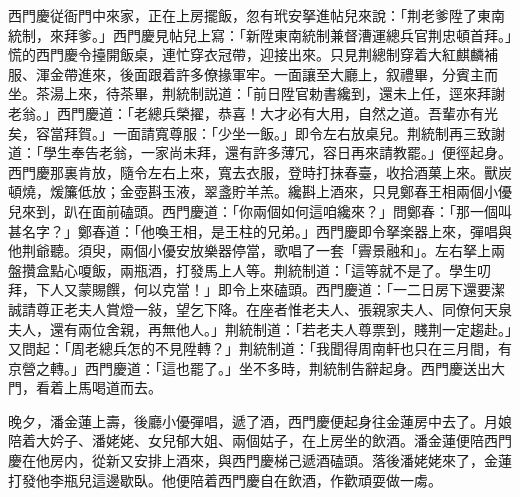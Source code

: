 西門慶従衙門中來家，正在上房擺飯，忽有玳安拏進帖兒來說：「荆老爹陞了東南統制，來拜爹。」西門慶見帖兒上寫：「新陞東南統制兼督漕運總兵官荆忠頓首拜。」慌的西門慶令擡開飯桌，連忙穿衣冠帶，迎接出來。只見荆總制穿着大紅麒麟補服、渾金帶進來，後面跟着許多僚掾軍牢。一面讓至大廳上，叙禮畢，分賓主而坐。茶湯上來，待茶畢，荆統制説道：「前日陞官勅書纔到，還未上任，逕來拜謝老翁。」西門慶道：「老總兵榮擢，恭喜！大才必有大用，自然之道。吾輩亦有光矣，容當拜賀。」一面請寬尊服：「少坐一飯。」即令左右放桌兒。荆統制再三致謝道：「學生奉告老翁，一家尚未拜，還有許多薄冗，容日再來請教罷。」便徑起身。西門慶那裏肯放，隨令左右上來，寬去衣服，登時打抹春臺，收拾酒菓上來。獸炭頓燒，煖簾低放；金壺斟玉液，翠盞貯羊羔。纔斟上酒來，只見鄭春王相兩個小優兒來到，趴在面前磕頭。西門慶道：「你兩個如何這咱纔來？」問鄭春：「那一個叫甚名字？」鄭春道：「他喚王相，是王柱的兄弟。」西門慶即令拏楽器上來，彈唱與他荆爺聽。須臾，兩個小優安放樂器停當，歌唱了一套「霽景融和」。左右拏上兩盤攢盒點心嗄飯，兩瓶酒，打發馬上人等。荆統制道：「這等就不是了。學生叨拜，下人又蒙賜饌，何以克當！」即令上來磕頭。西門慶道：「一二日房下還要潔誠請尊正老夫人賞燈一敍，望乞下降。在座者惟老夫人、張親家夫人、同僚何天泉夫人，還有兩位舍親，再無他人。」荆統制道：「若老夫人尊票到，賤荆一定趨赴。」又問起：「周老總兵怎的不見陞轉？」荆統制道：「我聞得周南軒也只在三月間，有京營之轉。」西門慶道：「這也罷了。」坐不多時，荆統制告辭起身。西門慶送出大門，看着上馬喝道而去。

晚夕，潘金蓮上壽，後廳小優彈唱，遞了酒，西門慶便起身往金蓮房中去了。月娘陪着大妗子、潘姥姥、女兒郁大姐、兩個姑子，在上房坐的飲酒。潘金蓮便陪西門慶在他房内，從新又安排上酒來，與西門慶梯己遞酒磕頭。落後潘姥姥來了，金蓮打發他李瓶兒這邊歇臥。他便陪着西門慶自在飲酒，作歡頑耍做一䖏。

